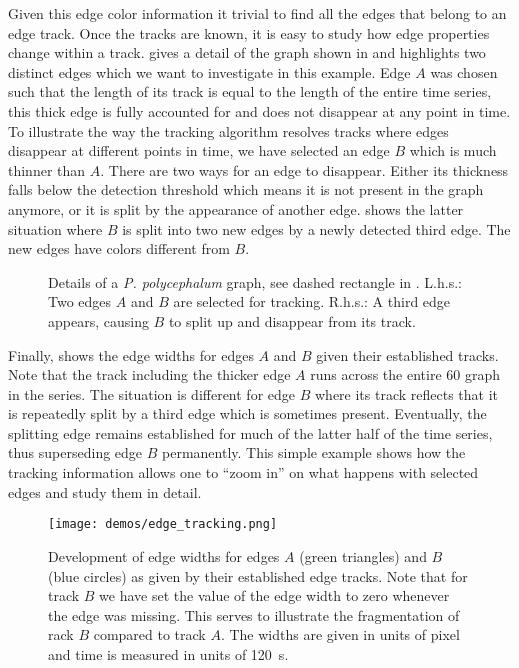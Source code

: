 	Given this edge color information it trivial to find all the edges that belong to an edge track. Once the tracks are known, it is easy to study how edge properties change within a track.  gives a detail of the graph shown in  and highlights two distinct edges which we want to investigate in this example. Edge $A$ was chosen such that the length of its track is equal to the length of the entire time series, \ie this thick edge is fully accounted for and does not disappear at any point in time. To illustrate the way the tracking algorithm resolves tracks where edges disappear at different points in time, we have selected an edge $B$ which is much thinner than $A$. There are two ways for an edge to disappear. Either its thickness falls below the detection threshold which means it is not present in the graph anymore, or it is split by the appearance of another edge.  shows the latter situation where $B$ is split into two new edges by a newly detected third edge. The new edges have colors different from $B$.

	\begin{figure}
		\centering
		\qquad
		\caption[Demo: Tracking of individual edges]{Details of a \emph{P. polycephalum} graph, see dashed rectangle in . L.h.s.: Two edges $A$ and $B$ are selected for tracking. R.h.s.: A third edge appears, causing $B$ to split up and disappear from its track.}
    \end{figure}

    Finally,  shows the edge widths for edges $A$ and $B$ given their established tracks. Note that the track including the thicker edge $A$ runs across the entire $60$ graph in the series. The situation is different for edge $B$ where its track reflects that it is repeatedly split by a third edge which is sometimes present. Eventually, the splitting edge remains established for much of the latter half of the time series, thus superseding edge $B$ permanently. This simple example shows how the tracking information allows one to ``zoom in'' on what happens with selected edges and study them in detail.

    \begin{figure}
		\centering
		\texttt{[image: demos/edge\_tracking.png]}%
		\caption{Development of edge widths for edges $A$ (green triangles) and $B$ (blue circles) as given by their established edge tracks. Note that for track $B$ we have set the value of the edge width to zero whenever the edge was missing. This serves to illustrate the fragmentation of rack $B$ compared to track $A$. The widths are given in units of pixel and time is measured in units of \SI{120}{\second}.}
		\label{fig:edge_tracking}%
    \end{figure}


